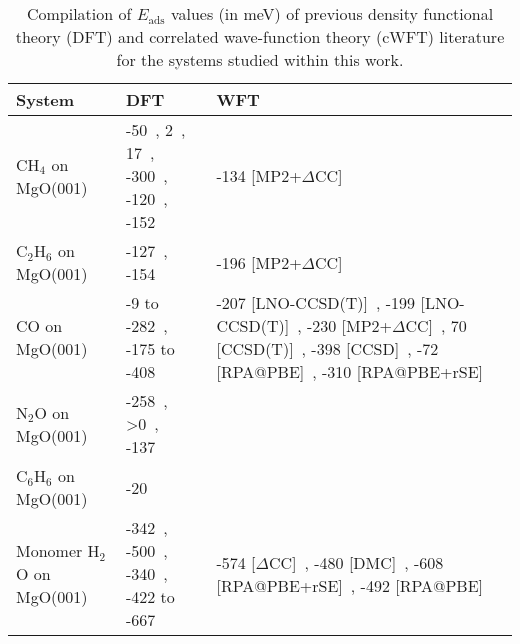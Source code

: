 \begin{table}

\caption{\label{tab:comp_lit}Compilation of $E_\textrm{ads}$ values (in meV) of previous density functional theory (DFT) and correlated wave-function theory (cWFT) literature for the systems studied within this work.}
\begin{adjustbox}{center}
\begin{tabular}{lp{7cm}p{7cm}}
\toprule
System & DFT & WFT \\ 
\midrule
CH$_4$ on MgO(001) & -50~\cite{trevethanBuildingBlocksMolecular2007}, 2~\cite{todnemMolecularAdsorptionMethane1999a}, 17~\cite{ferrariFTIRSpectroscopicDensity1998}, -300~\cite{manaeActivationCO2CH42022}, -120~\cite{mazheikaNiSubstitutionalDefects2016a}, -152~\cite{picciniEffectAnharmonicityAdsorption2014} & -134 [MP2+$\Delta$CC]~\cite{boeseAccurateAdsorptionEnergies2016} \\
C$_2$H$_6$ on MgO(001) & -127~\cite{boeseAccurateAdsorptionEnergies2016}, -154~\cite{boeseAccurateAdsorptionEnergies2016} & -196 [MP2+$\Delta$CC]~\cite{boeseAccurateAdsorptionEnergies2016} \\
CO on MgO(001) & -9 to -282~\cite{valeroGoodPerformanceM062008e}, -175 to -408~\cite{r.rehakIncludingDispersionDensity2020} & -207 [LNO-CCSD(T)]~\cite{yeAdsorptionVibrationalSpectroscopy2024a}, -199 [LNO-CCSD(T)]~\cite{shiManyBodyMethodsSurface2023a}, -230 [MP2+$\Delta$CC]~\cite{alessioChemicallyAccurateAdsorption2018}, 70 [CCSD(T)]~\cite{mazheikaNiSubstitutionalDefects2016}, -398 [CCSD]~\cite{mitraPeriodicDensityMatrix2022a}, -72 [RPA@PBE]~\cite{bajdichSurfaceEnergeticsAlkalineearth2015b}, -310 [RPA@PBE+rSE]~\cite{bajdichSurfaceEnergeticsAlkalineearth2015b} \\
N$_2$O on MgO(001) & -258~\cite{huesgesDispersionCorrectedDFT2014}, >0~\cite{scagnelliCatalyticDissociationN2O2006}, -137~\cite{huesgesDispersionCorrectedDFT2014} &  \\
C$_6$H$_6$ on MgO(001) & -20~\cite{trevethanBuildingBlocksMolecular2007} &  \\
Monomer H$_2$O on MgO(001) & -342~\cite{giordanoPartialDissociationWater1998a}, -500~\cite{carrascoDynamicIonPairs2008}, -340~\cite{huTrendsWaterMonomer2011}, -422 to -667~\cite{kebedeComparingVanWaals2017} & -574 [$\Delta$CC]~\cite{alessioChemicallyAccurateAdsorption2018}, -480 [DMC]~\cite{karaltiAdsorptionWaterMolecule2012}, -608 [RPA@PBE+rSE]~\cite{bajdichSurfaceEnergeticsAlkalineearth2015b}, -492 [RPA@PBE]~\cite{bajdichSurfaceEnergeticsAlkalineearth2015b} \\

\end{tabular}
\end{adjustbox}
\end{table}
